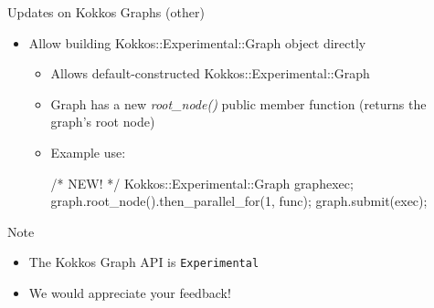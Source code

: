 
\begin{frame}[fragile]{Updates on Kokkos Graphs (other)}
 \begin{itemize}
    \item Allow building Kokkos::Experimental::Graph object directly
    \begin{itemize}
    \item Allows default-constructed Kokkos::Experimental::Graph 
    \item Graph has a new \emph{root\_node()} public member function (returns the graph's root node)
    \item Example use:
     \begin{code}[keywords={std}]
      /* NEW! */
      Kokkos::Experimental::Graph graph{exec};
      graph.root_node().then_parallel_for(1, func{});
      graph.submit(exec);
        \end{code}
     \end{itemize}
 \end{itemize}
   \begin{block}{Note}
 \begin{itemize}
   \item The Kokkos Graph API is \texttt{Experimental}
   \item We would appreciate your feedback!
 \end{itemize}
  \end{block}
\end{frame}






%





